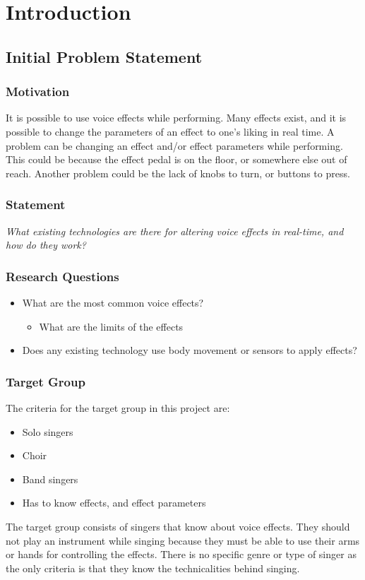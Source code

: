 \chapter{Introduction}

\section{Initial Problem Statement}

\subsection{Motivation}

It is possible to use voice effects while performing. Many effects exist, and it is possible to change the parameters of an effect to one's liking in real time. 
A problem can be changing an effect and/or effect parameters while performing. This could be because the effect pedal is on the floor, or somewhere else out of reach. Another problem could be the lack of knobs to turn, or buttons to press.

\subsection{Statement}

\textit{What existing technologies are there for altering voice effects in real-time, and how do they work?}


\subsection{Research Questions}

\begin{itemize}
	\item What are the most common voice effects?
	\begin{itemize}
		\item What are the limits of the effects
	\end{itemize}
	\item Does any existing technology use body movement or sensors to apply effects?
\end{itemize}

\subsection{Target Group}
The criteria for the target group in this project are:

\begin{itemize}
	\item Solo singers
	\item Choir
	\item Band singers
	\item Has to know effects, and effect parameters
\end{itemize}

The target group consists of singers that know about voice effects. They should not play an instrument while singing because they must be able to use their arms or hands for controlling the effects. There is no specific genre or type of singer as the only criteria is that they know the technicalities behind singing.

